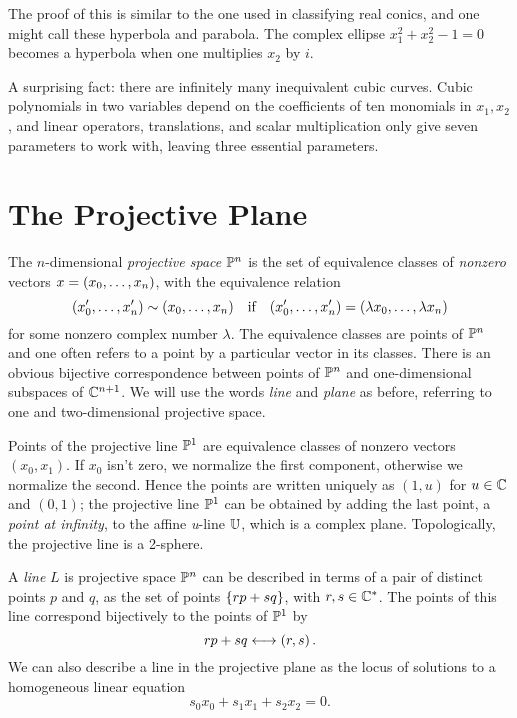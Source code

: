 \documentclass{report}
\begin{document}
The proof of this is similar to the one used in classifying real conics, and one might call these hyperbola and parabola.
The complex ellipse $x_1^2 + x_2^2 - 1 = 0$ becomes a hyperbola when one multiplies $x_2$ by $i$.

A surprising fact: there are infinitely many inequivalent cubic curves.
Cubic polynomials in two variables depend on the coefficients of ten monomials in $x_1,x_2$, and linear operators, translations, and scalar multiplication only give seven parameters to work with, leaving three essential parameters.

\newpage
\section{The Projective Plane}
The $n$-dimensional \emph{projective space} $\mathbb{P}^n$ is the set of equivalence classes of \emph{nonzero} vectors $x = \left( x_0,\dots,x_n \right)$, with the equivalence relation
\[
  \left( x_0',\dots,x_n' \right) \sim \left( x_0,\dots,x_n \right) \text{\hspace{5pt} if \hspace{5pt}}
  \left( x_0',\dots,x_n' \right) = \left( \lambda x_0,\dots, \lambda x_n \right)
\]
for some nonzero complex number $\lambda$. 
The equivalence classes are points of $\mathbb{P}^n$ and one often refers to a point by a particular vector in its classes.
There is an obvious bijective correspondence between points of $\mathbb{P}^n$ and one-dimensional subspaces of $\mathbb{C}^{n+1}$.
We will use the words \emph{line} and \emph{plane} as before, referring to one and two-dimensional projective space.

Points of the projective line $\mathbb{P}^1$ are equivalence classes of nonzero vectors $(x_0,x_1)$.
If $x_0$ isn't zero, we normalize the first component, otherwise we normalize the second.
Hence the points are written uniquely as $(1,u)$ for $u \in \mathbb{C}$ and $(0,1)$;
the projective line $\mathbb{P}^1$ can be obtained by adding the last point, a \emph{point at infinity}, to the affine \emph{u}-line $\mathbb{U}$, which is a complex plane.
Topologically, the projective line is a 2-sphere.

A \emph{line} $L$ is projective space $\mathbb{P}^n$ can be described in terms of a pair of distinct points $p$ and $q$, as the set of points $\left\{ rp + sq \right\}$, with $r,s \in \mathbb{C}^*$.
The points of this line correspond bijectively to the points of $\mathbb{P}^1$ by
\[
  rp + sq \longleftrightarrow \left( r,s \right).
\]
We can also describe a line in the projective plane as the locus of solutions to a homogeneous linear equation
\[
  s_0x_0 + s_1x_1 + s_2x_2 = 0.
\]
\end{document}
